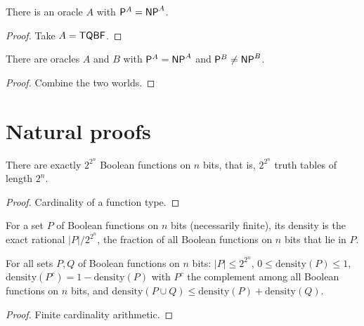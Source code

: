 \begin{theorem}
  \label{thm:barriers-equality-oracle}
  \notready
  There is an oracle $A$ with $\mathsf{P}^A = \mathsf{NP}^A$.
\end{theorem}
\begin{proof}
  Take $A = \mathsf{TQBF}$.
\end{proof}

\begin{corollary}
  \label{cor:barriers-bgs}
  \notready
  There are oracles $A$ and $B$ with $\mathsf{P}^A = \mathsf{NP}^A$ and
  $\mathsf{P}^B \neq \mathsf{NP}^B$.
\end{corollary}
\begin{proof}
  Combine the two worlds.
\end{proof}

\section{Natural proofs}

\begin{lemma}
  \label{lem:barriers-card-boolfunc}
  \leanok
  There are exactly $2^{2^n}$ Boolean functions on $n$ bits, that is,
  $2^{2^n}$ truth tables of length $2^n$.
\end{lemma}
\begin{proof}
  \leanok
  Cardinality of a function type.
\end{proof}

\begin{definition}
  \label{def:barriers-density}
  \leanok
  For a set $P$ of Boolean functions on $n$ bits (necessarily finite), its
  density is the exact rational $|P| / 2^{2^n}$, the fraction of all Boolean
  functions on $n$ bits that lie in $P$.
\end{definition}

\begin{lemma}
  \label{lem:barriers-density-laws}
  \leanok
  For all sets $P, Q$ of Boolean functions on $n$ bits: $|P| \le 2^{2^n}$,
  $0 \le \mathrm{density}(P) \le 1$,
  $\mathrm{density}(P^c) = 1 - \mathrm{density}(P)$ with $P^c$ the complement
  among all Boolean functions on $n$ bits, and
  $\mathrm{density}(P \cup Q) \le \mathrm{density}(P) + \mathrm{density}(Q)$.
\end{lemma}
\begin{proof}
  \leanok
  Finite cardinality arithmetic.
\end{proof}

